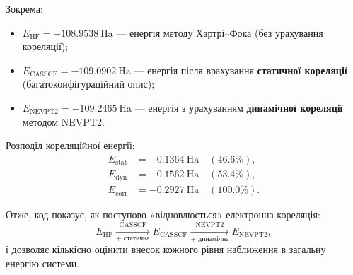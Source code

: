 Зокрема:
\begin{itemize}
  \item \(\displaystyle E_{\mathrm{HF}} = -108.9538~\text{Ha}\) ---
  енергія методу Хартрі–Фока (без урахування кореляції);
  \item \(\displaystyle E_{\mathrm{CASSCF}} = -109.0902~\text{Ha}\) ---
  енергія після врахування \textbf{статичної кореляції}
  (багатоконфігураційний опис);
  \item \(\displaystyle E_{\mathrm{NEVPT2}} = -109.2465~\text{Ha}\) ---
  енергія з урахуванням \textbf{динамічної кореляції} методом NEVPT2.
\end{itemize}

\noindent
Розподіл кореляційної енергії:
\[
\begin{aligned}
E_{\text{stat}} &= -0.1364~\text{Ha} \quad (46.6\%),\\
E_{\text{dyn}}  &= -0.1562~\text{Ha} \quad (53.4\%),\\
E_{\text{corr}} &= -0.2927~\text{Ha} \quad (100.0\%).
\end{aligned}
\]

Отже, код показує, як поступово «відновлюється» електронна кореляція:
\[
E_{\mathrm{HF}}
\xrightarrow[\text{+ статична}]{\text{CASSCF}}
E_{\mathrm{CASSCF}}
\xrightarrow[\text{+ динамічна}]{\text{NEVPT2}}
E_{\mathrm{NEVPT2}},
\]
і дозволяє кількісно оцінити внесок кожного рівня наближення
в загальну енергію системи.







